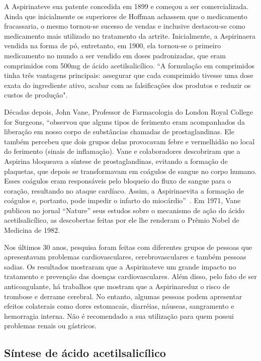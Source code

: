 A Aspirina\R teve sua patente concedida em 1899 e começou a ser comercializada.  Ainda que
inicialmente os superiores de Hoffman achassem que o medicamento fracassaria, o mesmo tornou-se
sucesso de vendas e inclusive destacou-se como medicamento mais utilizado no tratamento da artrite.
Inicialmente, a Aspirina\R era vendida na forma de pó, entretanto, em 1900, ela tornou-se o primeiro
medicamento no mundo a ser vendido em doses padronizadas, que eram comprimidos com 500mg de ácido
acetilsalicílico. “A formulação em comprimidos tinha três vantagens principais: assegurar que cada
comprimido tivesse uma dose exata do ingrediente ativo, acabar com as falsificações dos produtos e
reduzir os custos de produção".~\cite{aspirinabayer}

Décadas depois, John Vane, Professor de Farmacologia do London Royal College for Surgeons, “observou
que alguns tipos de ferimento eram acompanhados da liberação em nosso corpo de substâncias chamadas
de prostaglandinas. Ele também percebeu que dois grupos delas provocavam febre e vermelhidão no
local do ferimento (sinais de inflamação). Vane e colaboradores descobriram que a Aspirina\R
bloqueava a síntese de prostaglandinas, evitando a formação de plaquetas, que depois se
transformavam em coágulos de sangue no corpo humano. Esses coágulos eram responsáveis pelo bloqueio
do fluxo de sangue para o coração, resultando no ataque cardíaco. Assim, a Aspirina\R evita a
formação de coágulos e, portanto, pode impedir o infarto do miocárdio”~\cite{massabni2006}. Em 1971,
Vane publicou no jornal “Nature” seus estudos sobre o mecanismo de ação do ácido acetilsalicílico,
as descobertas feitas por ele lhe renderam o Prêmio Nobel de Medicina de 1982. 

Nos últimos 30 anos, pesquisa foram feitas com diferentes grupos de pessoas que apresentavam
problemas cardiovasculares, cerebrovasculares e também pessoas sadias. Os resultados mostraram que a
Aspirina\R teve um grande impacto no tratamento e prevenção das doenças cardiovasculares.  Além
disso, pelo fato de ser anticoagulante, há trabalhos que mostram que a Aspirina\R reduz o risco de
trombose e derrame cerebral. No entanto, algumas pessoas podem apresentar efeitos colaterais como
dores estomacais, diarréias, náuseas, sangramento e hemorragia interna. Não é recomendado a sua
utilização para quem possui problemas renais ou gástricos.

\subsection{Síntese de ácido acetilsalicílico}

